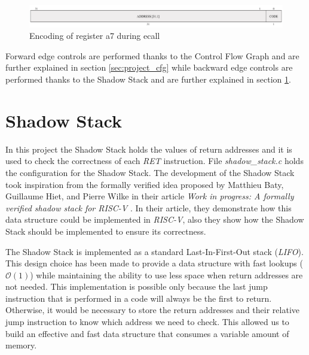 \begin{figure}[htbp]
  \centering
  \includegraphics[width=.9\linewidth]{images/ecall_code.png}
  \caption{Encoding of register a7 during ecall}
  \label{fig:ecall}
\end{figure}

Forward edge controls are performed thanks to the Control Flow Graph and are further
explained in section \ref{sec:project_cfg} while backward edge controls are performed
thanks to the Shadow Stack and are further explained in section \ref{sec:project_ss}.

\section{Shadow Stack}
\label{sec:project_ss}

In this project the Shadow Stack holds the values of return addresses and it is
used to check the correctness of each \textit{RET} instruction. File \textit{shadow\_stack.c}
holds the configuration for the Shadow Stack. The development of the Shadow
Stack took inspiration from the formally verified idea proposed by Matthieu Baty,
Guillaume Hiet, and Pierre Wilke in their article \textit{Work in progress: A formally
verified shadow stack for RISC-V} \cite{shadowstack}. In their article, they demonstrate
how this data structure could be implemented in \textit{RISC-V}, also they show how
the Shadow Stack should be implemented to ensure its correctness.

The Shadow Stack is implemented as a standard Last-In-First-Out stack (\textit{LIFO}).
This design choice has been made to provide a data structure with fast lookups ($\mathcal{O}
(1)$) while maintaining the ability to use less space when return addresses are not
needed. This implementation is possible only because the last jump instruction
that is performed in a code will always be the first to return. Otherwise, it
would be necessary to store the return addresses and their relative jump
instruction to know which address we need to check. This allowed us to build an effective
and fast data structure that consumes a variable amount of memory.


